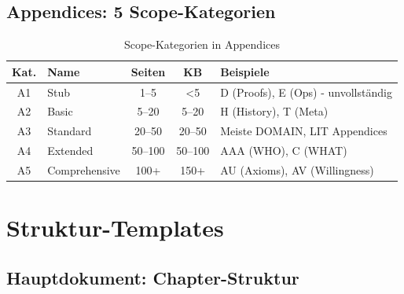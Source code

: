 \documentclass[12pt,a4paper]{article}
\begin{document}
\subsection{Appendices: 5 Scope-Kategorien}

\begin{table}[htbp]
\centering
\caption{Scope-Kategorien in Appendices}
\renewcommand{\arraystretch}{1.3}
\begin{tabular}{@{}clccp{5cm}@{}}
\toprule
\textbf{Kat.} & \textbf{Name} & \textbf{Seiten} & \textbf{KB} & \textbf{Beispiele} \\
\midrule
A1 & Stub & 1--5 & <5 & D (Proofs), E (Ops) - unvollständig \\
A2 & Basic & 5--20 & 5--20 & H (History), T (Meta) \\
A3 & Standard & 20--50 & 20--50 & Meiste DOMAIN, LIT Appendices \\
A4 & Extended & 50--100 & 50--100 & AAA (WHO), C (WHAT) \\
A5 & Comprehensive & 100+ & 150+ & AU (Axioms), AV (Willingness) \\
\bottomrule
\end{tabular}
\end{table}

\section{Struktur-Templates}

\subsection{Hauptdokument: Chapter-Struktur}
\end{document}
